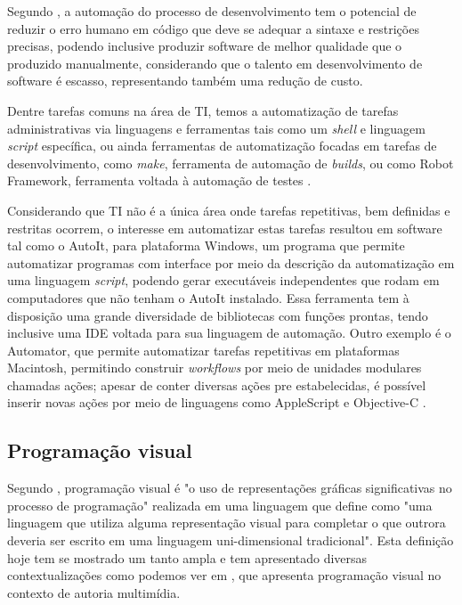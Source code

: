 \documentclass[12pt]{article}
\begin{document}
	Segundo \citeauthor{automionSoftEvolutionEffect}\cite{automionSoftEvolutionEffect}, a automação do processo de desenvolvimento tem o potencial de reduzir o erro humano em código que deve se adequar a sintaxe e restrições precisas, podendo inclusive produzir software de melhor qualidade que o produzido manualmente, considerando que o talento em desenvolvimento de software é escasso, representando também uma redução de custo.

	Dentre tarefas comuns na área de TI, temos a automatização de tarefas administrativas via linguagens e ferramentas tais como um \emph{shell} e linguagem \emph{script} específica, ou ainda ferramentas de automatização focadas em tarefas de desenvolvimento, como \emph{make}, ferramenta de automação de \emph{builds}, ou como Robot Framework, ferramenta voltada à automação de testes \cite{shell,make,robotFW}.

	Considerando que TI não é a única área onde tarefas repetitivas, bem definidas e restritas ocorrem, o interesse em automatizar estas tarefas resultou em software tal como o AutoIt\cite{autoit}, para plataforma Windows, um programa que permite automatizar programas com interface por meio da descrição da automatização em uma linguagem \emph{script}, podendo gerar executáveis independentes que rodam em computadores que não tenham o AutoIt instalado. Essa ferramenta tem à disposição uma grande diversidade de bibliotecas com funções prontas, tendo inclusive uma IDE voltada para sua linguagem de automação. Outro exemplo é o Automator, que permite automatizar tarefas repetitivas em plataformas Macintosh, permitindo construir \emph{workflows} por meio de unidades modulares chamadas ações; apesar de conter diversas ações pre estabelecidas, é possível inserir novas ações por meio de linguagens como AppleScript e Objective-C \cite{automator}.


	\subsection{Programação visual}

	Segundo \citeauthor{visualProgram}\cite{visualProgram}, programação visual é "o uso de representações gráficas significativas no processo de programação" realizada em uma linguagem que \citeauthor{visualProgram} define como "uma linguagem que utiliza alguma representação visual para completar o que outrora deveria ser escrito em uma linguagem uni-dimensional tradicional". Esta definição hoje tem se mostrado um tanto ampla e tem apresentado diversas contextualizações como podemos ver em \cite{visualProgAuth}, que apresenta programação visual no contexto de autoria multimídia.
\end{document}
